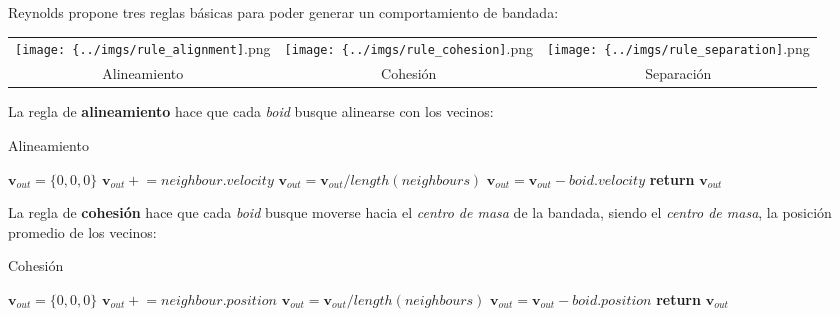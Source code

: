 \documentclass[a4paper]{article}
\begin{document}
            Reynolds propone tres reglas básicas para poder generar un comportamiento de bandada:

            \begin{table}[h]
            \begin{tabular}{ccc}
                \texttt{[image: \{../imgs/rule\_alignment]}.png} &
                \texttt{[image: \{../imgs/rule\_cohesion]}.png} &
                \texttt{[image: \{../imgs/rule\_separation]}.png} \\
                Alineamiento & Cohesión & Separación \\
            \end{tabular}
            \end{table}

            \pagebreak

            La regla de \textbf{alineamiento} hace que cada \textit{boid} busque alinearse con los vecinos:

            \begin{algorithm}
                \caption{Alineamiento}\label{pseudo:alignment}
                \begin{algorithmic}[1]
                    \State $\bm{v}_{out} = \{0, 0, 0\}$
                        \State $\bm{v}_{out} \mathrel{+}= neighbour.velocity$
                    \EndFor
                    \State $\bm{v}_{out} = \bm{v}_{out} / length(neighbours)$
                    \State $\bm{v}_{out} = \bm{v}_{out} - boid.velocity$
                    \State \textbf{return} $\bm{v}_{out}$
                \EndProcedure
                \end{algorithmic}
            \end{algorithm}

            La regla de \textbf{cohesión} hace que cada \textit{boid} busque moverse hacia el \textit{centro de masa} de la bandada, siendo el \textit{centro de masa}, la posición promedio de los vecinos:

            \begin{algorithm}
                \caption{Cohesión}\label{pseudo:cohesion}
                \begin{algorithmic}[1]
                    \State $\bm{v}_{out} = \{0, 0, 0\}$
                        \State $\bm{v}_{out} \mathrel{+}= neighbour.position$
                    \EndFor
                    \State $\bm{v}_{out} = \bm{v}_{out} / length(neighbours)$
                    \State $\bm{v}_{out} = \bm{v}_{out} - boid.position$
                    \State \textbf{return} $\bm{v}_{out}$
                \EndProcedure
                \end{algorithmic}
            \end{algorithm}
\end{document}
